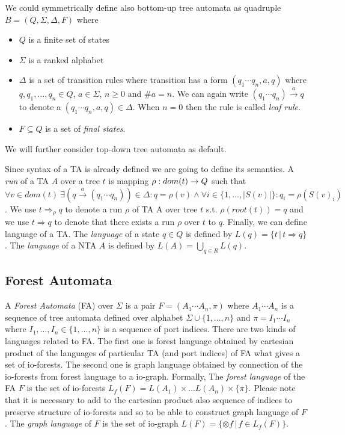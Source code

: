 We could symmetrically define also bottom-up tree automata as quadruple $B = (Q, \Sigma, \Delta, F)$ where
\begin{itemize}
	\item $Q$ is a finite set of states
	\item $\Sigma$ is a ranked alphabet
	\item $\Delta$ is a set of transition rules where transition has a form $(q_1 \cdots q_n,a,q)$ where $q,q_1,\ldots,q_n \in Q$, $a \in \Sigma$, $n \geq 0$ and $\#a = n$.
		We can again write $(q_1 \cdots q_n) \xrightarrow{a} q$ to denote a $(q_1 \cdots q_n,a,q) \in \Delta$.
		When $n=0$ then the rule is called \emph{leaf rule}.
	\item $F \subseteq Q$ is a set of \emph{final states}.
\end{itemize}

We will further consider top-down tree automata as default.

Since syntax of a TA is already defined we are going to define its semantics.
A \emph{run} of a TA $A$ over a tree $t$ is mapping $\rho: dom(t) \rightarrow Q$ such that
$\forall v \in dom(t)\ \exists (q \xrightarrow{a} (q_1 \cdots q_n)) \in \Delta:  q=\rho(v) \wedge  \forall i \in \{1, \ldots, |S(v)|\}: q_i=\rho(S(v)_i)$.
We use $t \Rightarrow_{\rho} q$ to denote a run $\rho$ of TA A over tree $t$ s.t. $\rho(root(t)) = q$ and we use $t \Rightarrow q$ to denote that there exists
a run $\rho$ over $t$ to $q$.
Finally, we can define language of a TA.
The \emph{language} of a state $q\in Q$ is defined by $L(q) = \{t\,|\, t \Rightarrow q\}$.
The \emph{language} of a NTA $A$ is defined by $L(A) = \bigcup_{q\in R} L(q)$.

\subsection{Forest Automata}
\label{subsec:fa}

A \emph{Forest Automata} (FA) over $\Sigma$ is a pair $F=(A_1\cdots A_n, \pi)$
where $A_1 \cdots A_n$ is a sequence of tree automata defined over alphabet $\Sigma \cup \{1,\ldots,n\}$
and $\pi = I_1 \cdots I_n$ where $I_1,\ldots, I_n \in \{1, \ldots, n\}$ is a sequence of port indices.
There are two kinds of languages related to FA.
The first one is forest language obtained by cartesian product of the languages of particular TA (and port indices) of FA
what gives a set of io-forests.
The second one is graph language obtained by connection of the io-forests from forest language to a io-graph.
Formally, The \emph{forest language} of the FA $F$ is the set of io-forests $L_f(F)= L(A_1) \times \ldots L(A_n) \times \{\pi\}$.
Please note that it is necessary to add to the cartesian product also sequence of indices to preserve structure of io-forests
and so to be able to construct graph language of $F$.
The \emph{graph language} of $F$ is the set of io-graph $L(F) = \{\otimes f\,|\, f \in L_f(F)\}$.

